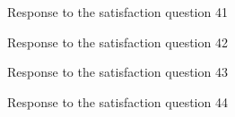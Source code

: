 \documentclass[12pt,oneside,openright,a4paper]{cpe-english-project}
\begin{document}
\begin{figure}[!h]\centering {} \caption{Response to the satisfaction question 41} \end{figure}
\begin{figure}[!h]\centering {} \caption{Response to the satisfaction question 42} \end{figure}
\begin{figure}[!h]\centering {} \caption{Response to the satisfaction question 43} \end{figure}
\begin{figure}[!h]\centering {} \caption{Response to the satisfaction question 44} \end{figure}
\end{document}
